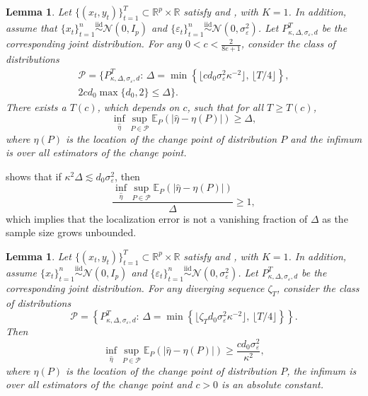 \documentclass[twoside]{article}
\newtheorem{lemma}[theorem]{Lemma}
\begin{document}
\begin{lemma}\label{lem-reg-lb-1}
Let $\{(x_t, y_t)\}_{t = 1}^T \subset \mathbb{R}^p \times \mathbb{R}$ satisfy  and , with $K = 1$.  In addition, assume that $\{x_t\}_{t=1}^n \stackrel{\mbox{iid}}{\sim} \mathcal{N}(0, I_p)$ and $\{ \varepsilon_t \}_{t=1}^n \stackrel{\mbox{iid}}{\sim} \mathcal{N}(0, \sigma_{\varepsilon}^2)$.  Let $P^T_{\kappa, \Delta, \sigma_{\varepsilon}, d}$ be the corresponding joint distribution.  For any $0 < c < \frac{2}{8e+1}$, consider the class of distributions
	\begin{align*}
		\mathcal{P} = \Big\{P^T_{\kappa, \Delta, \sigma_{\varepsilon}, d}: \, \Delta = \min\left\{\lfloor cd_0 \sigma_{\varepsilon}^2\kappa^{-2}\rfloor, \, \lfloor T/4\rfloor \right\},\\
		 2cd_0\max\{d_0, 2\} \leq \Delta\Big\}.
	\end{align*}
	There exists a $T(c)$, which depends on $c$, such that for all $T \geq T(c)$,
	\[
		\inf_{\widehat{\eta}} \sup_{P \in \mathcal{P}} \mathbb{E}_P(|\widehat{\eta} - \eta(P)|) \geq \Delta,
	\]
	where $\eta(P)$ is the location of the change point of distribution $P$ and the infimum is over all estimators of the change point. 
\end{lemma}

 shows that if $\kappa^2 \Delta \lesssim d_0 \sigma^2_{\varepsilon}$, then 
	\[
		\frac{\inf_{\widehat{\eta}} \sup_{P \in \mathcal{P}} \mathbb{E}_P(|\widehat{\eta} - \eta(P)|)}{\Delta} \geq 1,
	\]
	which implies that the localization error is not a vanishing fraction of $\Delta$ as the sample size grows unbounded.  
	

\begin{lemma}\label{lem-reg-lb-2}
Let $\{(x_t, y_t)\}_{t = 1}^T \subset \mathbb{R}^p \times \mathbb{R}$ satisfy  and , with $K = 1$.  In addition, assume $\{x_t\}_{t=1}^n \stackrel{\mbox{iid}}{\sim} \mathcal{N}(0, I_p)$ and $\{ \varepsilon_t \}_{t=1}^n \stackrel{\mbox{iid}}{\sim} \mathcal{N}(0, \sigma^2_{\varepsilon})$.  Let $P^T_{\kappa, \Delta, \sigma_{\varepsilon}, d}$ be the corresponding joint distribution.  For any diverging sequence $\zeta_T$, consider the class of distributions
	\[
		\mathcal{P} = \left\{P^T_{\kappa, \Delta, \sigma_{\varepsilon}, d}: \, \Delta = \min\left\{\lfloor \zeta_T d_0 \sigma_{\varepsilon}^2\kappa^{-2}\rfloor, \, \lfloor T/4\rfloor \right\} \right\}.
	\]
	Then 
	\[
		\inf_{\widehat{\eta}} \sup_{P \in \mathcal{P}} \mathbb{E}_P(|\widehat{\eta} - \eta(P)|)\geq \frac{cd_0 \sigma_{\varepsilon}^2}{\kappa^2},
	\]
	where $\eta(P)$ is the location of the change point of distribution $P$, the infimum is over all estimators of the change point and $c > 0$ is an absolute constant. 
\end{lemma}
\end{document}
